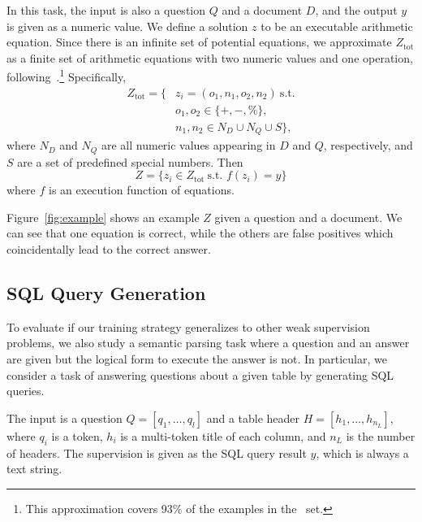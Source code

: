 \documentclass[11pt,a4paper]{article}
\begin{document}
In this task, the input is also a question $Q$ and a document $D$, and the output $y$ is given as a numeric value. We define a solution $z$ to be an executable arithmetic equation. Since there is an infinite set of potential equations, we approximate $Z_\text{tot}$ as a finite set of arithmetic equations with two numeric values and one operation, following~\citet{drop}.\footnote{This approximation covers 93\% of the examples in the \dev\ set.} Specifically, \begin{align*}
    {Z}_\text{tot} = \big\{ &z_i = (o_1, n_1, o_2, n_2) ~\text{s.t.} \\ 
    &o_1, o_2 \in \{ +, -, \% \}, \\
    &n_1, n_2 \in N_D \cup N_Q \cup S \big\},
\end{align*}
where $N_D$ and $N_Q$ are all numeric values appearing in $D$ and $Q$, respectively, and $S$ are a set of predefined special numbers. Then
\begin{equation*}
    Z = \{ z_i \in {Z}_\text{tot}~\text{s.t. } f(z_i) = y
    \}
\end{equation*}
where $f$ is an execution function of equations.

Figure~\ref{fig:example} shows an example $Z$ given a question and a document. We can see that one equation is correct, while the others are false positives which coincidentally lead to the correct answer.


\subsection{SQL Query Generation}
To evaluate if our training strategy generalizes to other weak supervision problems, we also study a semantic parsing task where a question and an answer are given but the logical form to execute the answer is not. In particular, we consider a task of answering questions about a given table by generating SQL queries.

The input is a question $Q = [q_1, \dots, q_l]$ and a table header $H = [h_1, \dots, h_{n_L}]$, where $q_i$ is a token, $h_i$ is a multi-token title of each column, and $n_L$ is the number of headers. The supervision is given as the SQL query result $y$, which is always a text string.
\end{document}
